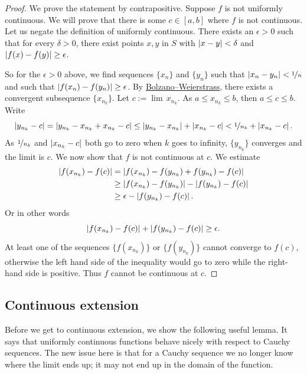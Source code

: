 \begin{proof}
We prove the statement by contrapositive.
Suppose $f$ is not uniformly continuous.  We will prove
that there is some
$c \in [a,b]$ where $f$ is not continuous.  Let us negate
the definition of uniformly continuous.
There exists an $\epsilon > 0$
such that for every $\delta > 0$, there exist points $x, y$ in $S$ with
$\left\lvert {x-y} \right\rvert < \delta$ and $\left\lvert {f(x)-f(y)} \right\rvert \geq \epsilon$.

So for the $\epsilon > 0$ above,
we find sequences $\{ x_n \}$ and $\{ y_n \}$ such that
$\left\lvert {x_n-y_n} \right\rvert < \nicefrac{1}{n}$ and such that $\left\lvert {f(x_n)-f(y_n)} \right\rvert \geq
\epsilon$.  By
\hyperref[thm:bwseq]{Bolzano--Weierstrass},
there exists a convergent subsequence
$\{ x_{n_k} \}$.  Let $c := \lim\, x_{n_k}$.
As $a \leq x_{n_k} \leq b$, then $a \leq c \leq b$.  Write
\begin{equation*}
\left\lvert {y_{n_k} - c} \right\rvert =
\left\lvert {y_{n_k} - x_{n_k} + x_{n_k} - c} \right\rvert \leq
\left\lvert {y_{n_k} - x_{n_k}} \right\rvert
+
\left\lvert {x_{n_k}-c} \right\rvert
<
\nicefrac{1}{n_k} 
+
\left\lvert {x_{n_k}-c} \right\rvert .
\end{equation*}
As $\nicefrac{1}{n_k}$ and $\left\lvert {x_{n_k}-c} \right\rvert$ both go to zero when
$k$ goes to infinity, $\{ y_{n_k} \}$ converges and the limit
is $c$.  We now show that $f$ is not continuous at $c$.  We
estimate
\begin{equation*}
\begin{split}
\left\lvert {f(x_{n_k}) - f(c)} \right\rvert & =
\left\lvert {f(x_{n_k}) - f(y_{n_k}) + f(y_{n_k}) - f(c)} \right\rvert \\
& \geq
\left\lvert {f(x_{n_k}) - f(y_{n_k})} \right\rvert - \left\lvert {f(y_{n_k}) - f(c)} \right\rvert \\
& \geq
\epsilon - \left\lvert {f(y_{n_k})-f(c)} \right\rvert .
\end{split}
\end{equation*}
Or in other words
\begin{equation*}
\left\lvert {f(x_{n_k})-f(c)} \right\rvert 
+
\left\lvert {f(y_{n_k})-f(c)} \right\rvert  \geq
\epsilon .
\end{equation*}
At least one of the sequences $\{ f(x_{n_k}) \}$  or
$\{ f(y_{n_k}) \}$ cannot converge to $f(c)$, otherwise the left
hand side of the inequality would go to zero while the right-hand side is positive.
Thus $f$ cannot be continuous at $c$.
\end{proof}

\subsection{Continuous extension}

Before we get to continuous extension, we show the following useful lemma.
It says that uniformly continuous functions behave nicely with respect
to Cauchy sequences.  The new issue here is that for a Cauchy sequence
we no longer know where the limit ends up; it may not end up in the domain
of the function.

